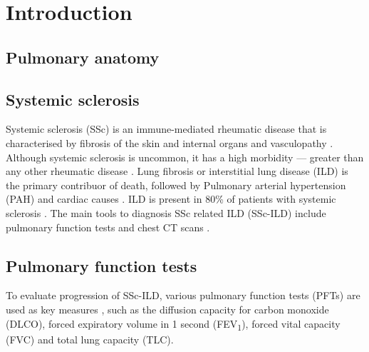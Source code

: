 \graphicspath{{Introduction/figures/}}
\chapter{Introduction}\label{ch:intro}

\ThumbIndexShow

\newcommand{\tb}{\textit{{\textbf{}}}}



\section{Pulmonary anatomy}


\section{Systemic sclerosis}
Systemic sclerosis (SSc) is an immune-mediated rheumatic disease that is characterised by fibrosis of the skin and internal organs and vasculopathy \cite{denton2017systemic}. Although systemic sclerosis is uncommon, it has a high morbidity — greater than any other rheumatic disease \cite{denton2017systemic}. Lung fibrosis or interstitial lung disease (ILD) is the primary contribuor of death, followed by Pulmonary arterial hypertension (PAH) and cardiac causes  \cite{Acharya2013, steele2012clinical}. ILD is present in 80\% of patients with systemic sclerosis \cite{codes2023systemic}. The main tools to diagnosis SSc related ILD (SSc-ILD) include pulmonary function tests and chest CT scans \cite{codes2023systemic}.

\section{Pulmonary function tests}

To evaluate progression of SSc-ILD, various pulmonary function tests (PFTs) are used as key measures \cite{Behr2008, Caron2018, Ninaber2015}, such as the diffusion capacity for carbon monoxide (DLCO), forced expiratory volume in 1 second (FEV\textsubscript{1}), forced vital capacity (FVC) and total lung capacity (TLC). 

